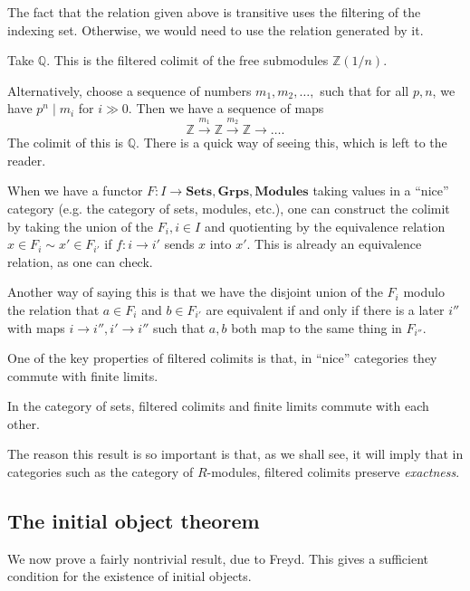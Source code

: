 The fact that the relation given above is transitive uses the filtering of the
indexing set. Otherwise, we would need to use the relation generated by it.

\begin{example}
Take $\mathbb{Q}$. This is the filtered colimit of the free submodules
$\mathbb{Z}(1/n)$.

Alternatively, choose a sequence of numbers $m_1 , m_2, \dots, $ such that for
all $p, n$, we have $p^n \mid m_i$ for $i \gg 0$. Then we have a sequence of
maps
\[ \mathbb{Z} \stackrel{m_1}{\to} \mathbb{Z} \stackrel{m_2}{\to}\mathbb{Z}
\to \dots.   \]
The colimit of this is $\mathbb{Q}$. There is a quick way of seeing this, which
is left to the reader.
\end{example}

When we have a functor $F: I \to \mathbf{Sets}, \mathbf{Grps},
\mathbf{Modules}$ taking values in a ``nice'' category (e.g. the category of
sets, modules, etc.), one can construct the colimit by taking the union of the
$F_i, i \in I$ and quotienting by the equivalence relation $x \in F_i \sim x'
\in F_{i'}$ if $f: i \to i'$ sends $x$ into $x'$. This is already an
equivalence relation, as one can check.

Another way of saying this is that we have the disjoint union of the $F_i$
modulo the relation that $a \in F_i$ and $b \in F_{i'}$ are equivalent if and
only if there is a later $i''$ with maps $i \to i'', i' \to i''$ such that
$a,b$ both map to the same thing in $F_{i''}$.


One of the key properties of filtered colimits is that, in ``nice'' categories they commute with
finite limits.

\begin{proposition} 
In the category of sets, filtered colimits and finite limits commute with each
other.
\end{proposition} 

The reason this result is so important is that, as we shall see, it will imply
that in categories such as the category of $R$-modules, filtered colimits
preserve \emph{exactness}. 


\subsection{The initial object theorem}

We now prove a fairly nontrivial result, due to Freyd. This gives a sufficient
condition for the existence of initial objects.

